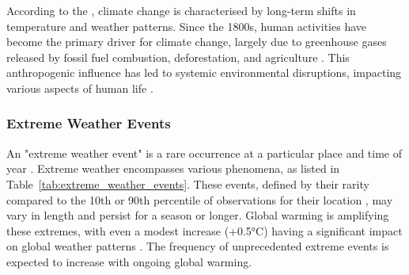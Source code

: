 According to the \textcite{UNClimateChange}, climate change is characterised by long-term shifts in temperature and weather patterns. Since the 1800s, human activities have become the primary driver for climate change, largely due to greenhouse gases released by fossil fuel combustion, deforestation, and agriculture \parencite{ipcc2023_wg2_1}. This anthropogenic influence has led to systemic environmental disruptions, impacting various aspects of human life \parencite{ipcc_2023_policy}.

\subsubsection{Extreme Weather Events}
\label{subsubsec:extreme-weather}
An "extreme weather event" is a rare occurrence at a particular place and time of year \parencite[2908]{ipcc_2023_wg2_full}. Extreme weather encompasses various phenomena, as listed in Table~\ref{tab:extreme_weather_events}. These events, defined by their rarity compared to the 10th or 90th percentile of observations for their location \parencite[2908]{ipcc_2023_wg2_full}, may vary in length and persist for a season or longer. Global warming is amplifying these extremes, with even a modest increase (+0.5°C) having a significant impact on global weather patterns \parencite[1583]{ipcc2023_wg1_11}. The frequency of unprecedented extreme events is expected to increase with ongoing global warming.


